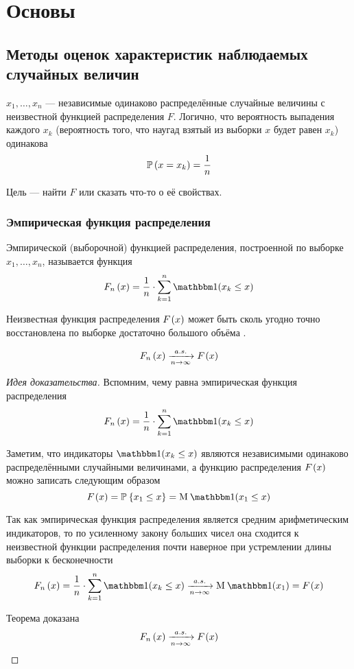 \chapter{Основы}
\section{Методы оценок характеристик наблюдаемых случайных величин}
$x_1, \dots, x_n$ --- независимые одинаково распределённые случайные величины
с неизвестной функцией распределения $F$.
Логично, что вероятность выпадения каждого $x_k$
(вероятность того, что наугад взятый из выборки $x$ будет равен $x_k$)
одинакова
$$\mathbb{P}\left( x=x_k \right) = \frac{1}{n}$$

Цель --- найти $F$ или сказать что-то о её свойствах.

\subsection{Эмпирическая функция распределения}
\begin{definition}
  Эмпирической (выборочной) функцией распределения,
  построенной по выборке $x_1, \dots, x_n$, называется функция
  $$\cdfn{x}=\frac{1}{n}\cdot \sum_{k=1}^n
  \indicator{x_k\le x}$$
\end{definition}

Неизвестная функция распределения $F_{}\left(x\right)$ может быть сколь угодно
точно восстановлена по выборке достаточно большого объёма
\cite[стр.~25]{BorovkovMS}.

\begin{theorem}\label{theorem:distributionFunction:empiricalToCumulative}
  $$F_n\left(x\right) \xrightarrow[n\to\infty]{a.s.} F_{}\left(x\right)$$
\end{theorem}
\begin{proof}[Идея доказательства]
Вспомним, чему равна эмпирическая функция распределения
$$\cdfn{x}=\frac{1}{n}\cdot \sum_{k=1}^n
\indicator{x_k\le x}$$

Заметим, что индикаторы $\indicator{x_k\le x}$
являются независимыми одинаково распределёнными случайными величинами,
а функцию распределения $F_{}\left(x\right)$ можно записать следующим образом
$$\cdf{x}=\Probability{x_1\le x}=\mean{\indicator{x_1\le x}}$$

Так как эмпирическая функция распределения является
средним арифметическим индикаторов, то по усиленному закону больших чисел
она сходится к неизвестной функции распределения почти наверное
при устремлении длины выборки к бесконечности
$$\cdfn{x}=\frac{1}{n}\cdot\sum_{k=1}^n\indicator{x_k\le x}
\acovergence\mean{\indicator{x_1}}=\cdf{x}$$

Теорема доказана
$$F_n\left(x\right) \xrightarrow[n\to\infty]{a.s.} F_{}\left(x\right)$$
\end{proof}

